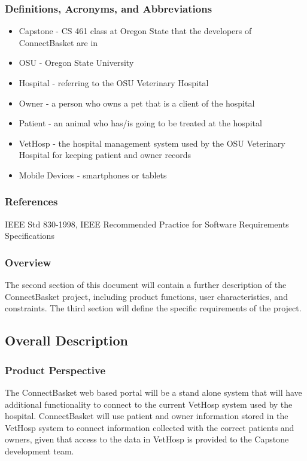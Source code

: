 \documentclass[onecolumn, draftclsnofoot,10pt, compsoc]{IEEEtran}
\begin{document}
\subsubsection{Definitions, Acronyms, and Abbreviations}
\begin{itemize}
\item Capstone - CS 461 class at Oregon State that the developers of ConnectBasket are in
 
\item OSU - Oregon State University

\item Hospital - referring to the OSU Veterinary Hospital

\item Owner - a person who owns a pet that is a client of the hospital

\item Patient - an animal who has/is going to be treated at the hospital 

\item VetHosp - the hospital management system used by the OSU Veterinary Hospital for keeping patient and owner records

\item Mobile Devices - smartphones or tablets
\end{itemize}
\subsubsection{References}
IEEE Std 830-1998, IEEE Recommended Practice for Software Requirements Specifications

\subsubsection{Overview}
The second section of this document will contain a further description of the ConnectBasket project, including product functions, user characteristics, and constraints. The third section will define the specific requirements of the project. 

\subsection{Overall Description}

\subsubsection{Product Perspective}
The ConnectBasket web based portal will be a stand alone system that will have additional functionality to connect to the current VetHosp system used by the hospital. ConnectBasket will use patient and owner information stored in the VetHosp system to connect information collected with the correct patients and owners, given that access to the data in VetHosp is provided to the Capstone development team.
\end{document}
